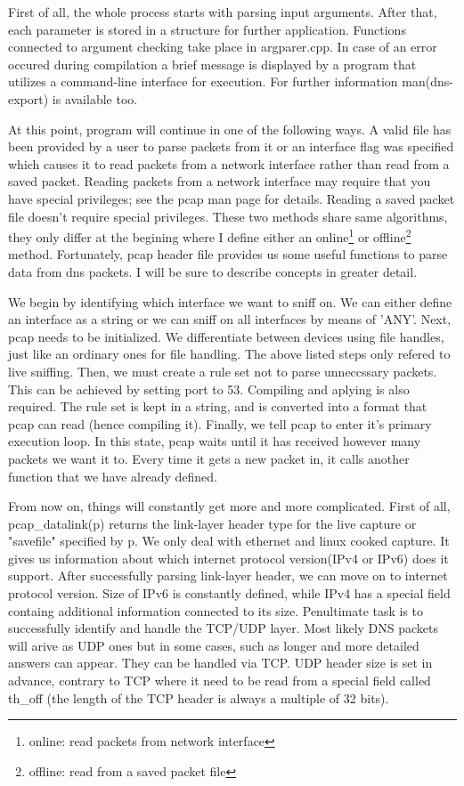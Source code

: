 \documentclass[11pt,a4paper]{article}
\begin{document}
First of all, the whole process starts with parsing input arguments. After that, each parameter is stored in a structure for further application. Functions connected to argument checking take place in argparer.cpp. In case of an error occured during compilation a brief message is displayed by a program that utilizes a command-line interface for execution. For further information man(dns-export) is available too.

At this point, program will continue in one of the following ways. A valid file has been provided by a user to parse packets from it or an interface flag was specified which causes it to read packets from a network interface rather than read from a saved packet. Reading packets from a network interface may require that you have special privileges; see the pcap man page for details. Reading a saved packet file doesn't require special privileges. These two methods share same algorithms, they only differ at the begining where I define either an online\footnote{online: read packets from network interface} or offline\footnote{offline: read from a saved packet file} method. Fortunately, pcap header file provides us some useful functions to parse data from dns packets. I will be sure to describe concepts in greater detail.

We begin by identifying which interface we want to sniff on. We can either define an interface as a string or we can sniff on all interfaces by means of 'ANY'. Next, pcap needs to be initialized. We differentiate between devices using file handles, just like an ordinary ones for file handling. The above listed steps only refered to live sniffing. Then, we must create a rule set not to parse unneccssary packets. This can be achieved by setting port to 53. Compiling and aplying is also required. The rule set is kept in a string, and is converted into a format that pcap can read (hence compiling it). Finally, we tell pcap to enter it's primary execution loop. In this state, pcap waits until it has received however many packets we want it to. Every time it gets a new packet in, it calls another function that we have already defined.

From now on, things will constantly get more and more complicated. First of all, pcap\_datalink(p) returns the link-layer header type for the live capture or "savefile" specified by p. We only deal with ethernet and linux cooked capture. It gives us information about which internet protocol version(IPv4 or IPv6) does it support. After successfully parsing link-layer header, we can move on to internet protocol version. Size of IPv6 is constantly defined, while IPv4 has a special field containg additional information connected to its size. Penultimate task is to successfully identify and handle the TCP/UDP layer. Most likely DNS packets will arive as UDP ones but in some cases, such as longer and more detailed answers can appear. They can be handled via TCP. UDP header size is set in advance, contrary to TCP where it need to be read from a special field called th\_off (the length of the TCP header is always a multiple of 32 bits).
\end{document}
